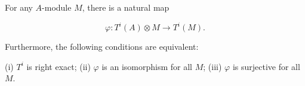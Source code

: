 For any $A$-module $M$, there is a natural map

$$\varphi: T^i(A) \otimes M \to T^i(M).$$

Furthermore, the following conditions are equivalent:

(i) $T^i$ is right exact;
(ii) $\varphi$ is an isomorphism for all $M$;
(iii) $\varphi$ is surjective for all $M$.
